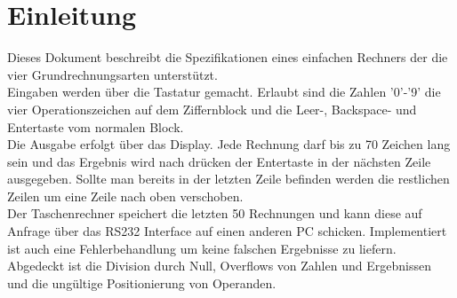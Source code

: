 \section{Einleitung}

Dieses Dokument beschreibt die Spezifikationen eines einfachen Rechners der die vier Grundrechnungsarten unterstützt.\\ 
Eingaben werden über die Tastatur gemacht. Erlaubt sind die Zahlen '0'-'9' die vier Operationszeichen auf dem Ziffernblock und 
die Leer-, Backspace- und Entertaste vom normalen Block.\\
Die Ausgabe erfolgt über das Display. Jede Rechnung darf bis zu 70 Zeichen lang sein und das Ergebnis wird nach drücken der Entertaste 
in der nächsten Zeile ausgegeben. Sollte man bereits in der letzten Zeile befinden werden die restlichen Zeilen um eine Zeile nach oben
verschoben.\\
Der Taschenrechner speichert die letzten 50 Rechnungen und kann diese auf Anfrage über das RS232 Interface auf einen anderen PC schicken.
Implementiert ist auch eine Fehlerbehandlung um keine falschen Ergebnisse zu liefern. Abgedeckt ist die Division durch Null, Overflows von
Zahlen und Ergebnissen und die ungültige Positionierung von Operanden.
